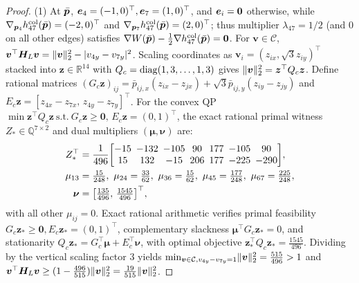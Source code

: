 \begin{proof}
(1) At $\bar{\boldsymbol{p}}$, $\boldsymbol{e}_4=(-1,0)^{\top},\boldsymbol{e}_7=(1,0)^{\top}$, and $\boldsymbol{e}_i=\boldsymbol 0$ otherwise, while $\nabla_{\boldsymbol{p}_4}h_{47}^{\mathrm{col}}(\bar{\boldsymbol{p}})=(-2,0)^{\top}$ and $\nabla_{\boldsymbol{p}_7}h_{47}^{\mathrm{col}}(\bar{\boldsymbol{p}})=(2,0)^{\top}$; thus multiplier $\lambda_{47}=1/2$ (and $0$ on all other edges) satisfies $\nabla W(\bar{\boldsymbol{p}})-\frac12\nabla h_{47}^{\mathrm{col}}(\bar{\boldsymbol{p}})=\boldsymbol 0$. For $\boldsymbol v\in\mathcal C$, $\boldsymbol v^{\top}\boldsymbol H_L\boldsymbol v=\lVert\boldsymbol v\rVert_2^2-|v_{4y}-v_{7y}|^2$. Scaling coordinates as $\boldsymbol v_i=(z_{ix},\sqrt{3}z_{iy})^{\top}$ stacked into $\boldsymbol z\in\mathbb R^{14}$ with $Q_c=\operatorname{diag}(1,3,\dots,1,3)$ gives $\lVert\boldsymbol v\rVert_2^2=\boldsymbol z^{\top}Q_c\boldsymbol z$. Define rational matrices $(G_c\boldsymbol z)_{ij}=\bar p_{ij,x}(z_{ix}-z_{jx})+\sqrt{3}\bar p_{ij,y}(z_{iy}-z_{jy})$ and $E_c\boldsymbol z=[z_{4x}-z_{7x},\,z_{4y}-z_{7y}]^{\top}$. For the convex QP $\min\boldsymbol z^{\top}Q_c\boldsymbol z\ \text{s.t.}\ G_c\boldsymbol z\ge\boldsymbol 0,\,E_c\boldsymbol z=(0,1)^{\top}$, the exact rational primal witness $Z_*\in\mathbb Q^{7\times 2}$ and dual multipliers $(\boldsymbol\mu,\boldsymbol\nu)$ are:
\begin{equation}
\begin{split}
 Z_*^{\top}&=\frac{1}{496}{\setlength{\arraycolsep}{2.5pt}\begin{bmatrix}
 -15 & -132 & -105 & 90 & 177 & -105 & 90\\
 15 & 132 & -15 & 206 & 177 & -225 & -290
 \end{bmatrix}},\\
 \mu_{13}&=\tfrac{15}{248},\ \mu_{24}=\tfrac{33}{62},\ \mu_{36}=\tfrac{15}{62},\ \mu_{45}=\tfrac{177}{248},\ \mu_{67}=\tfrac{225}{248},\\
 \boldsymbol\nu&=\big[\tfrac{135}{496},\,\tfrac{1545}{496}\big]^{\top},
\end{split}\label{eq:certificate-primal}
\end{equation}
with all other $\mu_{ij}=0$. Exact rational arithmetic verifies primal feasibility $G_c\boldsymbol z_*\ge\boldsymbol 0,E_c\boldsymbol z_*=(0,1)^{\top}$, complementary slackness $\boldsymbol\mu^{\top}G_c\boldsymbol z_*=0$, and stationarity $Q_c\boldsymbol z_*=G_c^{\top}\boldsymbol\mu+E_c^{\top}\boldsymbol\nu$, with optimal objective $\boldsymbol z_*^{\top}Q_c\boldsymbol z_*=\frac{1545}{496}$. Dividing by the vertical scaling factor $3$ yields $\min_{\boldsymbol v\in\mathcal C,v_{4y}-v_{7y}=1}\lVert\boldsymbol v\rVert_2^2=\frac{515}{496}>1$ and $\boldsymbol v^{\top}\boldsymbol H_L\boldsymbol v\ge(1-\frac{496}{515})\lVert\boldsymbol v\rVert_2^2=\frac{19}{515}\lVert\boldsymbol v\rVert_2^2$.


\end{proof}
